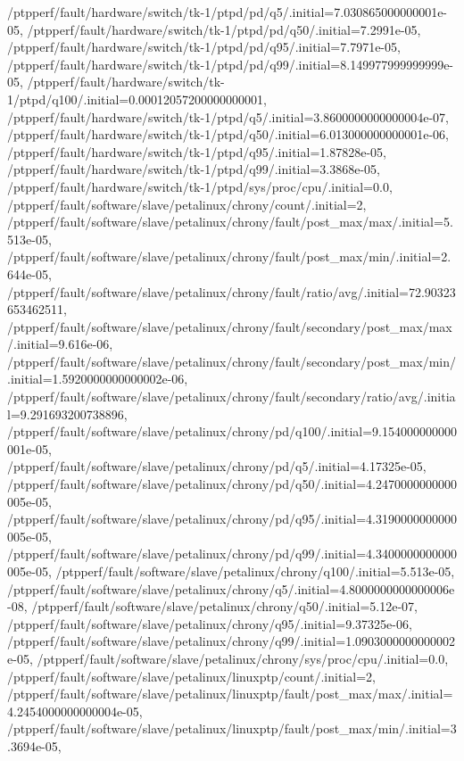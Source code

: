 {    /ptpperf/fault/hardware/switch/tk-1/ptpd/pd/q5/.initial=7.030865000000001e-05,
    /ptpperf/fault/hardware/switch/tk-1/ptpd/pd/q50/.initial=7.2991e-05,
    /ptpperf/fault/hardware/switch/tk-1/ptpd/pd/q95/.initial=7.7971e-05,
    /ptpperf/fault/hardware/switch/tk-1/ptpd/pd/q99/.initial=8.149977999999999e-05,
    /ptpperf/fault/hardware/switch/tk-1/ptpd/q100/.initial=0.00012057200000000001,
    /ptpperf/fault/hardware/switch/tk-1/ptpd/q5/.initial=3.8600000000000004e-07,
    /ptpperf/fault/hardware/switch/tk-1/ptpd/q50/.initial=6.013000000000001e-06,
    /ptpperf/fault/hardware/switch/tk-1/ptpd/q95/.initial=1.87828e-05,
    /ptpperf/fault/hardware/switch/tk-1/ptpd/q99/.initial=3.3868e-05,
    /ptpperf/fault/hardware/switch/tk-1/ptpd/sys/proc/cpu/.initial=0.0,
    /ptpperf/fault/software/slave/petalinux/chrony/count/.initial=2,
    /ptpperf/fault/software/slave/petalinux/chrony/fault/post_max/max/.initial=5.513e-05,
    /ptpperf/fault/software/slave/petalinux/chrony/fault/post_max/min/.initial=2.644e-05,
    /ptpperf/fault/software/slave/petalinux/chrony/fault/ratio/avg/.initial=72.90323653462511,
    /ptpperf/fault/software/slave/petalinux/chrony/fault/secondary/post_max/max/.initial=9.616e-06,
    /ptpperf/fault/software/slave/petalinux/chrony/fault/secondary/post_max/min/.initial=1.5920000000000002e-06,
    /ptpperf/fault/software/slave/petalinux/chrony/fault/secondary/ratio/avg/.initial=9.291693200738896,
    /ptpperf/fault/software/slave/petalinux/chrony/pd/q100/.initial=9.154000000000001e-05,
    /ptpperf/fault/software/slave/petalinux/chrony/pd/q5/.initial=4.17325e-05,
    /ptpperf/fault/software/slave/petalinux/chrony/pd/q50/.initial=4.2470000000000005e-05,
    /ptpperf/fault/software/slave/petalinux/chrony/pd/q95/.initial=4.3190000000000005e-05,
    /ptpperf/fault/software/slave/petalinux/chrony/pd/q99/.initial=4.3400000000000005e-05,
    /ptpperf/fault/software/slave/petalinux/chrony/q100/.initial=5.513e-05,
    /ptpperf/fault/software/slave/petalinux/chrony/q5/.initial=4.8000000000000006e-08,
    /ptpperf/fault/software/slave/petalinux/chrony/q50/.initial=5.12e-07,
    /ptpperf/fault/software/slave/petalinux/chrony/q95/.initial=9.37325e-06,
    /ptpperf/fault/software/slave/petalinux/chrony/q99/.initial=1.0903000000000002e-05,
    /ptpperf/fault/software/slave/petalinux/chrony/sys/proc/cpu/.initial=0.0,
    /ptpperf/fault/software/slave/petalinux/linuxptp/count/.initial=2,
    /ptpperf/fault/software/slave/petalinux/linuxptp/fault/post_max/max/.initial=4.2454000000000004e-05,
    /ptpperf/fault/software/slave/petalinux/linuxptp/fault/post_max/min/.initial=3.3694e-05,
}
